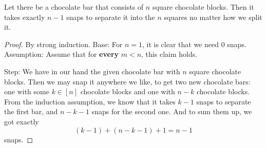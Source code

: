 \begin{example} 
  Let there be a chocolate bar that consists of \(n\) square chocolate blocks. Then it takes exactly \(n - 1\) snaps to separate it into the \(n\) squares no matter how we split it.

  \begin{proof} By strong induction. Base: For \(n = 1\), it is clear that we need \(0\) snaps. Assumption: Assume that for \textbf{every} \(m < n \), this claim holds.


Step: We have in our hand the given chocolate bar with \(n\) square chocolate blocks. Then we may snap it anywhere we like, to get two new chocolate bars: one with some \( k \in [n]\) chocolate blocks and one with \(n - k\) chocolate blocks. From the induction assumption, we know that it takes \(k - 1\) snaps to separate the first bar, and \(n - k - 1\) snaps for the second one. And to sum them up, we got exactly \[ (k - 1) + (n - k - 1) + 1 = n - 1 \] snaps.
\end{proof}
\end{example}


